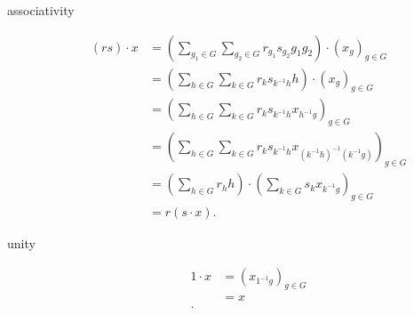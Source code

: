\documentclass[titlepage, a4paper]{article}
\theoremstyle{remark}
\begin{document}
\begin{description}
            \item[associativity]
                 \begin{align*}
                     (rs)\cdot x &= \left( \sum_{g_1 \in G} \sum_{g_2 \in G} r_{g_1} s_{g_2} g_1 g_2 \right) \cdot (x_{g})_{g \in G} \\
                             &= \left( \sum_{h \in G} \sum_{k \in G} r_{k}s_{k^{-1}h} h\right) \cdot  \left( x_{g} \right)_{g \in G} \\
                             &= \left( \sum_{h \in G} \sum_{k \in G} r_k s_{k^{-1}h} x_{h^{-1}g} \right)_{g \in G}  \\
                             &= \left( \sum_{h \in G} \sum_{k \in G} r_k s_{k^{-1}h} x_{(k^{-1} h)^{-1}(k^{-1}g)} \right)_{g \in G}  \\
                             &= \left(\sum_{h \in G} r_h h\right) \cdot  \left( \sum_{k \in G} s_{k} x_{k^{-1}g} \right)_{g \in G} \\
                             &= r(s\cdot x) 
                .\end{align*}
            \item[unity]
                \begin{align*}
                    1\cdot x &= (x_{1^{-1} g})_{g \in G} \\
                         &= x\\
                .\end{align*}
    \end{description}

	\pagebreak
	\printbibliography
\end{document}
